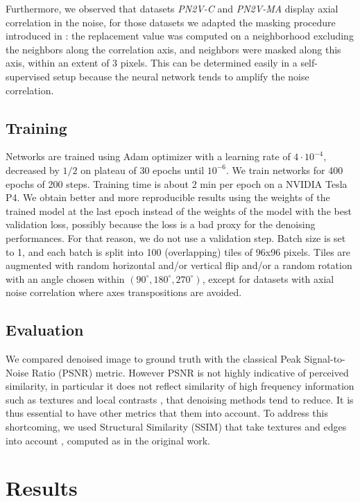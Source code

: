 \documentclass{article}
\begin{document}
Furthermore, we observed that datasets \emph{PN2V-C} and \emph{PN2V-MA} display axial correlation in the noise, for those datasets we adapted the masking procedure introduced in \cite{broaddus2020removing}: the replacement value was computed on a neighborhood excluding the neighbors along the correlation axis, and neighbors were masked along this axis, within an extent of 3 pixels. This can be determined easily in a self-supervised setup because the neural network tends to amplify the noise correlation.

\subsection{Training}
\label{sec:training}
Networks are trained using Adam optimizer with a learning rate of $4\cdot10^{-4}$, decreased by $1/2$ on plateau of 30 epochs until $10^{-6}$. We train networks for 400 epochs of 200 steps.
Training time is about 2 min per epoch on a NVIDIA Tesla P4.
We obtain better and more reproducible results using the weights of the trained model at the last epoch instead of the weights of the model with the best validation loss, possibly because the loss is a bad proxy for the denoising performances. For that reason, we do not use a validation step.
Batch size is set to 1, and each batch is split into 100 (overlapping) tiles of 96x96 pixels.
Tiles are augmented with random horizontal and/or vertical flip and/or a random rotation with an angle chosen within $(90^\circ, 180^\circ, 270^\circ)$, except for datasets with axial noise correlation where axes transpositions are avoided.

\subsection{Evaluation}
We compared denoised image to ground truth with the classical Peak Signal-to-Noise Ratio (PSNR) metric.
However PSNR is not highly indicative of perceived similarity, in particular it does not reflect similarity of high frequency information such as textures and local contrasts \cite{wang2004image}, that denoising methods tend to reduce. It is thus essential to have other metrics that them into account.
To address this shortcoming, we used Structural Similarity (SSIM) that take textures and edges into account \cite{wang2004image}, computed as in the original work.

\section{Results}
\label{sec:results}
\end{document}

